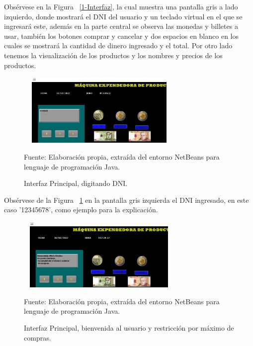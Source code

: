 \documentclass[10pt,conference]{IEEEtran}
\begin{document}
Obsérvese en la Figura ~\ref{1-Interfaz}, la cual muestra una pantalla gris a lado izquierdo, donde mostrará el DNI del usuario y un teclado virtual en el que se ingresará este, además en la parte central se observa las monedas y billetes a usar, también los botones comprar y cancelar y dos espacios en blanco en los cuales se mostrará la cantidad de dinero ingresado y el total. Por otro lado tenemos la visualización de los productos y los nombres y precios de los productos.

\begin{figure}[H]
    \begin{center}
    \includegraphics[width=8cm, height=3.5cm]{Resultados/2-Interfaz.JPG}
    \centering
    \caption{Interfaz Principal, digitando DNI.}
    \label{2-Interfaz} 
    \vspace{1.5 mm}
    {\small Fuente: Elaboración propia, extraída del entorno NetBeans para lenguaje de programación Java.}
    \end{center}
\end{figure}

Obsérvese de la Figura ~\ref{2-Interfaz} en la pantalla gris izquierda el DNI ingresado, en este caso '12345678', como ejemplo para la explicación.

\begin{figure}[H]
    \begin{center}
    \includegraphics[width=8cm, height=3.5cm]{Resultados/3-Interfaz.JPG}
    \centering
    \caption{Interfaz Principal, bienvenida al usuario y restricción por máximo de compras.}
    \label{3-Interfaz} 
    \vspace{1.5 mm}
    {\small Fuente: Elaboración propia, extraída del entorno NetBeans para lenguaje de programación Java.}
    \end{center}
\end{figure}
\end{document}
